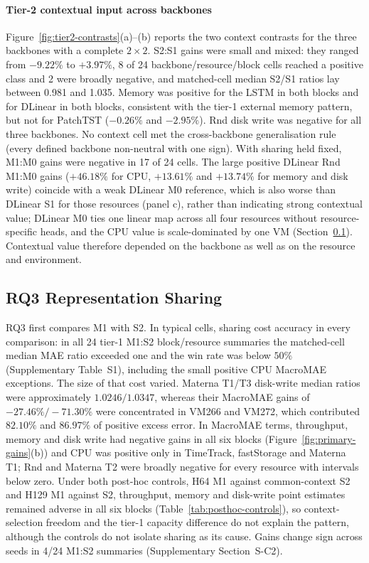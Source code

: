 \documentclass[5p,twocolumn]{elsarticle}
\begin{document}
\paragraph{Tier-2 contextual input across backbones}
Figure~\ref{fig:tier2-contrasts}(a)--(b) reports the two context contrasts
for the three backbones with a complete $2\times2$. S2:S1 gains were small
and mixed: they ranged from $-9.22\%$ to $+3.97\%$, 8 of 24
backbone/resource/block cells reached a positive class and 2 were broadly
negative, and matched-cell median S2/S1 ratios lay between 0.981 and 1.035.
Memory was positive for the LSTM in both blocks and for DLinear in both
blocks, consistent with the tier-1 external memory pattern, but not for
PatchTST ($-0.26\%$ and $-2.95\%$). Rnd disk write was negative for all
three backbones. No context cell met the cross-backbone generalisation rule
(every defined backbone non-neutral with one sign). With sharing held fixed,
M1:M0 gains were negative in 17 of 24 cells. The large positive DLinear Rnd
M1:M0 gains ($+46.18\%$ for CPU, $+13.61\%$ and $+13.74\%$ for memory and disk
write) coincide with a weak DLinear M0 reference, which is also worse than
DLinear S1 for those resources (panel c), rather than indicating strong
contextual value; DLinear M0 ties one linear map across all four resources without
resource-specific heads, and the CPU value is scale-dominated by one VM
(Section~\ref{sec:results-rq2}). Contextual value therefore depended on the
backbone as well as on the resource and environment.

\subsection{RQ3 Representation Sharing}
\label{sec:results-rq2}

RQ3 first compares M1 with S2. In typical cells, sharing cost accuracy in
every comparison: in all 24 tier-1 M1:S2 block/resource summaries the
matched-cell median MAE ratio exceeded one and the win rate was below $50\%$
(Supplementary Table~S1), including the small positive CPU MacroMAE
exceptions. The size of that cost varied. Materna T1/T3 disk-write median
ratios were approximately $1.0246/1.0347$, whereas their MacroMAE gains of
$-27.46\%/-71.30\%$ were concentrated in VM266 and VM272, which contributed
$82.10\%$ and $86.97\%$ of positive excess error. In MacroMAE terms,
throughput, memory and disk write had negative gains in all six blocks
(Figure~\ref{fig:primary-gains}(b)) and CPU was positive only in TimeTrack,
fastStorage and Materna T1; Rnd and Materna T2 were broadly negative for
every resource with intervals below zero. Under both post-hoc controls, H64
M1 against common-context S2 and H129 M1 against S2, throughput, memory and
disk-write point estimates remained adverse in all six blocks
(Table~\ref{tab:posthoc-controls}), so context-selection freedom and the
tier-1 capacity difference do not explain the pattern, although the
controls do not isolate sharing as its cause. Gains change sign across seeds
in 4/24 M1:S2 summaries (Supplementary Section~S-C2).
\end{document}
